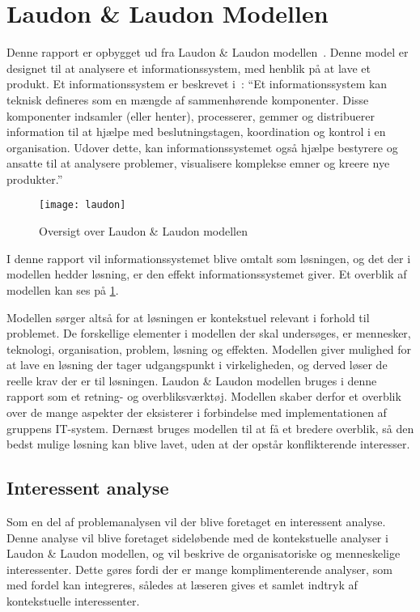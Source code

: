 \section{Laudon \& Laudon Modellen}
Denne rapport er opbygget ud fra Laudon \& Laudon modellen~\cite{laudon}. Denne model er designet til at analysere et informationssystem, med henblik på at lave et produkt. Et informationssystem er beskrevet i~\cite{laudon2006management}: \enquote{Et informationssystem kan teknisk defineres som en mængde af sammenhørende komponenter. Disse komponenter indsamler (eller henter), processerer, gemmer og distribuerer information til at hjælpe med beslutningstagen, koordination og kontrol i en organisation. Udover dette, kan informationssystemet også hjælpe bestyrere og ansatte til at analysere problemer, visualisere komplekse emner og kreere nye produkter.}

\begin{figure}
  \centering
  \texttt{[image: laudon]}
	\caption{Oversigt over Laudon \& Laudon modellen}
	\label{fig:oversigt_laudon}
\end{figure}

I denne rapport vil informationssystemet blive omtalt som løsningen, og det der i modellen hedder løsning, er den effekt informationssystemet giver. Et overblik af modellen kan ses på \cref{fig:oversigt_laudon}. 

Modellen sørger altså for at løsningen er kontekstuel relevant i forhold til problemet. De forskellige elementer i modellen der skal undersøges, er mennesker, teknologi, organisation, problem, løsning og effekten. Modellen giver mulighed for at lave en løsning der tager udgangspunkt i virkeligheden, og derved løser de reelle krav der er til løsningen. Laudon \& Laudon modellen bruges i denne rapport som et retning- og overbliksværktøj. Modellen skaber derfor et overblik over de mange aspekter der eksisterer i forbindelse med implementationen af gruppens IT-system. Dernæst bruges modellen til at få et bredere overblik, så den bedst mulige løsning kan blive lavet, uden at der opstår konflikterende interesser.

\subsection{Interessent analyse}

Som en del af problemanalysen vil der blive foretaget en interessent analyse. Denne analyse vil blive foretaget sideløbende med de kontekstuelle analyser i Laudon \& Laudon modellen, og vil beskrive de organisatoriske og menneskelige interessenter. Dette gøres fordi der er mange komplimenterende analyser, som med fordel kan integreres, således at læseren gives et samlet indtryk af kontekstuelle interessenter. 
